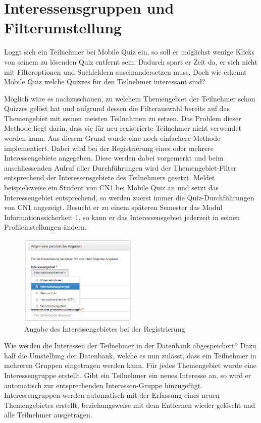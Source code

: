 \section{Interessensgruppen und Filterumstellung}
Loggt sich ein Teilnehmer bei Mobile Quiz ein, so soll er möglichst wenige Klicks von seinem zu lösenden Quiz entfernt sein. Dadurch spart er Zeit da, er sich nicht mit Filteroptionen und Suchfeldern auseinandersetzen muss. Doch wie erkennt Mobile Quiz welche Quizzes für den Teilnehmer interessant sind?

Möglich wäre es nachzuschauen, zu welchem Themengebiet der Teilnehmer schon Quizzes gelöst hat und aufgrund dessen die Filterauswahl bereits auf das Themengebiet mit seinen meisten Teilnahmen zu setzen. Das Problem dieser Methode liegt darin, dass sie für neu registrierte Teilnehmer nicht verwendet werden kann.
Aus diesem Grund wurde eine noch einfachere Methode implementiert. Dabei wird bei der Registrierung eines oder mehrere Interessengebiete angegeben. Diese werden dabei vorgemerkt und beim anschliessenden Aufruf aller Durchführungen wird der Themengebiet-Filter entsprechend der Interessensgebiete des Teilnehmers gesetzt. Meldet beispielsweise ein Student von CN1 bei Mobile Quiz an und setzt das Interessengebiet entsprechend, so werden zuerst immer die Quiz-Durchführungen von CN1 angezeigt. Besucht er zu einem späteren Semester das Modul Informationssicherheit 1, so kann er das Interessensgebiet jederzeit in seinen Profileinstellungen ändern.

\begin{figure}[H]
	\centering
	\includegraphics[width=0.5\textwidth]{Images/Themengebiet_Angabe_Registrierung.PNG}
	\caption{Angabe des Interessengebietes bei der Registrierung}
\end{figure}

Wie werden die Interessen der Teilnehmer in der Datenbank abgespeichert? Dazu half die Umstellung der Datenbank, welche es nun zulässt, dass ein Teilnehmer in mehreren Gruppen eingetragen werden kann.
Für jedes Themengebiet wurde eine Interessengruppe erstellt. Gibt ein Teilnehmer ein neues Interesse an, so wird er automatisch zur entsprechenden Interessen-Gruppe hinzugefügt. Interessengruppen werden automatisch mit der Erfassung eines neuen Themengebietes erstellt, beziehungsweise mit dem Entfernen wieder gelöscht und alle Teilnehmer ausgetragen.

